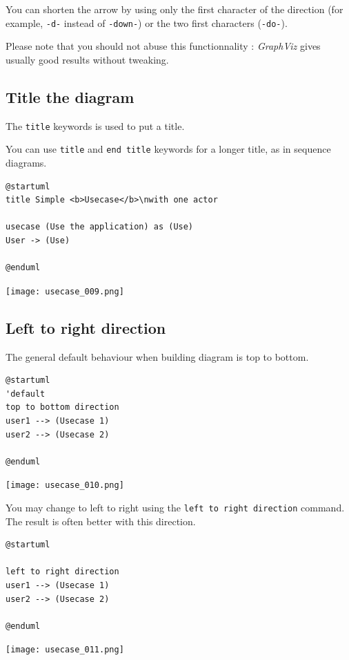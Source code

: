 You can shorten the arrow by using only the first character of the direction
(for example, \texttt{-d-} instead of \texttt{-down-}) or the two first
characters (\texttt{-do-}).

Please note that you should not abuse this functionnality : \textit{GraphViz}
gives usually good results without tweaking.

\subsection{Title the diagram}

\begin{description}
\item The \texttt{title} keywords is used to put a title.
\item You can use \texttt{title} and \texttt{end title} keywords for a longer
title, as in sequence diagrams.
\end{description}

\begin{lstlisting}
@startuml
title Simple <b>Usecase</b>\nwith one actor

usecase (Use the application) as (Use)
User -> (Use)

@enduml
\end{lstlisting}
\begin{center}
\texttt{[image: usecase\_009.png]}
\end{center}

\newpage \subsection{Left to right direction}

The general default behaviour when building diagram is top to bottom.


\begin{lstlisting}
@startuml
'default
top to bottom direction
user1 --> (Usecase 1)
user2 --> (Usecase 2)

@enduml
\end{lstlisting}
\begin{center}
\texttt{[image: usecase\_010.png]}
\end{center}

You may change to left to right using the \texttt{left to right direction} command. The result is often better with this direction.
\begin{lstlisting}
@startuml

left to right direction
user1 --> (Usecase 1)
user2 --> (Usecase 2)

@enduml
\end{lstlisting}
\begin{center}
\texttt{[image: usecase\_011.png]}
\end{center}

